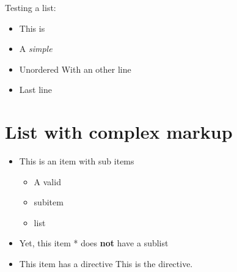 Testing a list:
\begin{itemize}\item This is
\item A \textit{simple}
\item Unordered
With an other line
\item Last line
\end{itemize}

\chapter{List with complex markup}
\begin{itemize}\item This is an item with sub items
\begin{itemize}\item A valid
\item subitem
\item list
\end{itemize}
\item Yet, this item
* does \textbf{not} have a sublist
\item This item has a directive
This is the directive.
\end{itemize}
